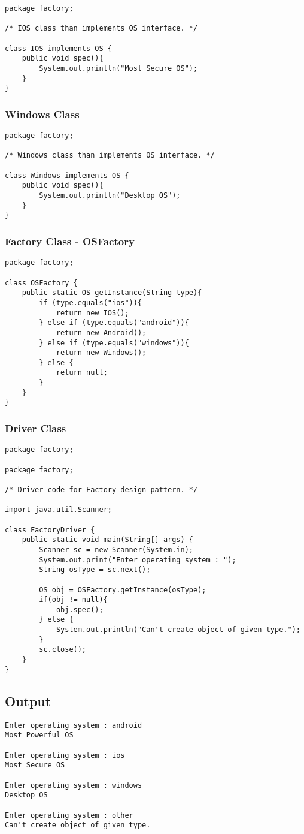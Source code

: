 \begin{verbatim}
package factory;

/* IOS class than implements OS interface. */

class IOS implements OS {
    public void spec(){
        System.out.println("Most Secure OS");
    }
}
\end{verbatim}

\subsubsection{Windows Class}

\begin{verbatim}
package factory;

/* Windows class than implements OS interface. */

class Windows implements OS {
    public void spec(){
        System.out.println("Desktop OS");
    }
}
\end{verbatim}

\subsubsection{Factory Class - OSFactory}

\begin{verbatim}
package factory;

class OSFactory {
    public static OS getInstance(String type){
        if (type.equals("ios")){
            return new IOS();
        } else if (type.equals("android")){
            return new Android();
        } else if (type.equals("windows")){
            return new Windows();
        } else {
            return null;
        }
    }
}
\end{verbatim}

\subsubsection{Driver Class}

\begin{verbatim}
package factory;

package factory;

/* Driver code for Factory design pattern. */

import java.util.Scanner;

class FactoryDriver {
    public static void main(String[] args) {
        Scanner sc = new Scanner(System.in);
        System.out.print("Enter operating system : ");
        String osType = sc.next();
        
        OS obj = OSFactory.getInstance(osType);
        if(obj != null){
            obj.spec();
        } else {
            System.out.println("Can't create object of given type.");
        }
        sc.close();
    }
}
\end{verbatim}

\subsection{Output}

\begin{verbatim}
Enter operating system : android
Most Powerful OS

Enter operating system : ios
Most Secure OS

Enter operating system : windows
Desktop OS

Enter operating system : other
Can't create object of given type.
\end{verbatim}